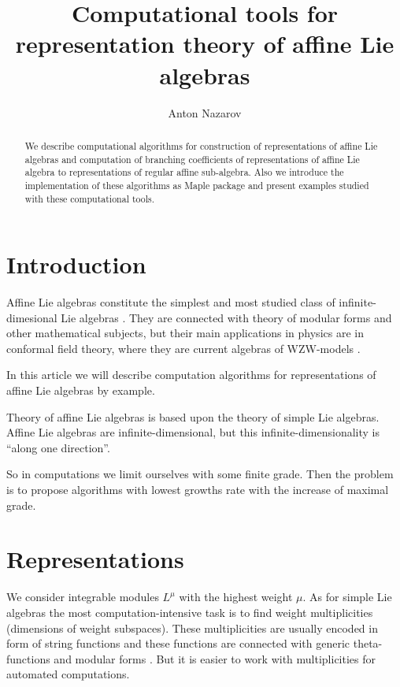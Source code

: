 \documentclass[a4paper,12pt]{article}
\title{Computational tools for representation theory of affine Lie algebras}
\author{Anton Nazarov}
\theoremstyle{definition} \newtheorem{Def}{Definition}
\begin{document}
\maketitle
\begin{abstract}
  We describe computational algorithms for construction of
  representations of affine Lie algebras and computation of branching
  coefficients of representations of affine Lie algebra to
  representations of regular affine sub-algebra. Also we introduce the
  implementation of these algorithms as Maple package and present
  examples studied with these computational tools. 
\end{abstract}

\section{Introduction}
\label{sec:introduction}

Affine Lie algebras constitute the simplest and most studied class of
infinite-dimesional Lie algebras \cite{wakimoto2001idl,kac1990idl}. They are connected with theory of
modular forms and other mathematical subjects, but their main
applications in physics are in conformal field theory, where they are
current algebras of WZW-models \cite{Walton:1999xc,witten1984nab}.


In this article we will describe computation algorithms for representations of affine Lie algebras by example.

Theory of affine Lie algebras is based upon the theory of simple Lie
algebras. Affine Lie algebras are infinite-dimensional, but this
infinite-dimensionality is ``along one direction''.

So in computations we limit ourselves with some finite grade. 
Then the problem is to propose algorithms with lowest growths rate
with the increase of maximal grade.

\section{Representations}
\label{sec:representations}

We consider integrable modules $L^{\mu}$ with the highest weight
$\mu$. As for simple Lie algebras the most computation-intensive task
is to find weight multiplicities (dimensions of weight subspaces). 
These multiplicities are usually encoded in form of string functions
and these functions are connected with generic theta-functions and
modular forms \cite{kac1990idl}. 
But it is easier to work with multiplicities for automated
computations.  
\end{document}
